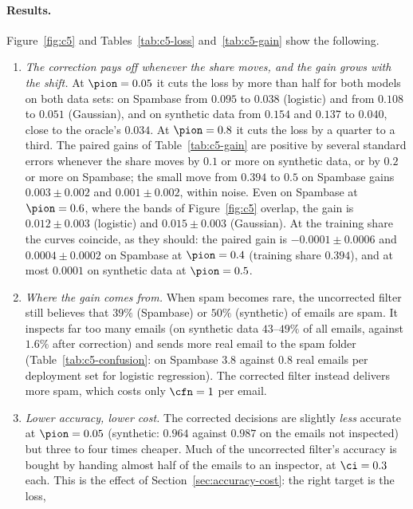 \paragraph{Results.}
Figure~\ref{fig:c5} and Tables~\ref{tab:c5-loss} and~\ref{tab:c5-gain} show the following.
\begin{enumerate}[itemsep=2pt,topsep=2pt]
  \item \emph{The correction pays off whenever the share moves, and the gain grows with the shift.}
        At $\pion=0.05$ it cuts the loss by more than half for both models on both data sets: on Spambase from
        $0.095$ to $0.038$ (logistic) and from $0.108$ to $0.051$ (Gaussian), and on synthetic data from
        $0.154$ and $0.137$ to $0.040$, close to the oracle's $0.034$. At $\pion=0.8$ it cuts the loss by a
        quarter to a third. The paired gains of Table~\ref{tab:c5-gain} are positive by several standard errors
        whenever the share moves by $0.1$ or more on synthetic data, or by $0.2$ or more on Spambase; the small move
        from $0.394$ to $0.5$ on Spambase gains $0.003\pm0.002$ and $0.001\pm0.002$, within noise. Even on Spambase at
        $\pion=0.6$, where the bands of Figure~\ref{fig:c5} overlap,
        the gain is $0.012\pm0.003$ (logistic) and $0.015\pm0.003$ (Gaussian). At the training share the
        curves coincide, as they should: the paired gain is $-0.0001\pm0.0006$ and $0.0004\pm0.0002$ on Spambase at
        $\pion=0.4$ (training share $0.394$), and at most $0.0001$ on synthetic data at $\pion=0.5$.
  \item \emph{Where the gain comes from.} When spam becomes rare, the uncorrected filter still believes that
        $39\%$ (Spambase) or $50\%$ (synthetic) of emails are spam. It inspects far too many emails (on synthetic
        data $43$--$49\%$ of all emails, against $1.6\%$ after correction) and sends more real email to the
        spam folder (Table~\ref{tab:c5-confusion}: on Spambase $3.8$ against $0.8$ real emails per deployment set
        for logistic regression). The corrected filter instead delivers more spam, which costs only $\cfn=1$
        per email.
  \item \emph{Lower accuracy, lower cost.} The corrected decisions are slightly \emph{less} accurate at
        $\pion=0.05$ (synthetic: $0.964$ against $0.987$ on the emails not inspected) but three to four times
        cheaper. Much of the uncorrected filter's accuracy is bought by handing almost half of the emails to
        an inspector, at $\ci=0.3$ each. This is the effect of Section~\ref{sec:accuracy-cost}: the right target is the loss,

\end{enumerate}

